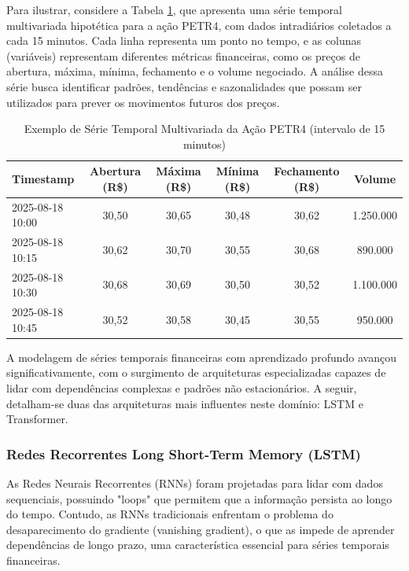 Para ilustrar, considere a Tabela \ref{tab:exemplo_serie_temporal}, que apresenta uma série temporal multivariada hipotética para a ação PETR4, com dados intradiários coletados a cada 15 minutos. Cada linha representa um ponto no tempo, e as colunas (variáveis) representam diferentes métricas financeiras, como os preços de abertura, máxima, mínima, fechamento e o volume negociado. A análise dessa série busca identificar padrões, tendências e sazonalidades que possam ser utilizados para prever os movimentos futuros dos preços.

\begin{table}[H]
\centering
\caption{Exemplo de Série Temporal Multivariada da Ação PETR4 (intervalo de 15 minutos)}
\label{tab:exemplo_serie_temporal}
\begin{tabular}{lccccc}
\hline
\textbf{Timestamp} & \textbf{Abertura (R\$)} & \textbf{Máxima (R\$)} & \textbf{Mínima (R\$)} & \textbf{Fechamento (R\$)} & \textbf{Volume} \\
\hline
2025-08-18 10:00 & 30,50 & 30,65 & 30,48 & 30,62 & 1.250.000 \\
2025-08-18 10:15 & 30,62 & 30,70 & 30,55 & 30,68 &   890.000 \\
2025-08-18 10:30 & 30,68 & 30,69 & 30,50 & 30,52 & 1.100.000 \\
2025-08-18 10:45 & 30,52 & 30,58 & 30,45 & 30,55 &   950.000 \\
\hline
\end{tabular}
\end{table}


A modelagem de séries temporais financeiras com aprendizado profundo avançou significativamente, com o surgimento de arquiteturas especializadas capazes de lidar com dependências complexas e padrões não estacionários. A seguir, detalham-se duas das arquiteturas mais influentes neste domínio: LSTM e Transformer.

\subsubsection{Redes Recorrentes Long Short-Term Memory (LSTM)}

As Redes Neurais Recorrentes (RNNs) foram projetadas para lidar com dados sequenciais, possuindo "loops" que permitem que a informação persista ao longo do tempo. Contudo, as RNNs tradicionais enfrentam o problema do desaparecimento do gradiente (vanishing gradient), o que as impede de aprender dependências de longo prazo, uma característica essencial para séries temporais financeiras.


